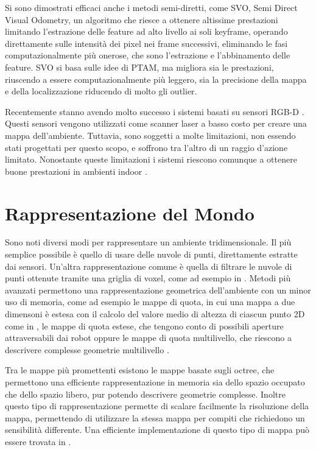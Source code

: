 Si sono dimostrati efficaci anche i metodi semi-diretti, come SVO, Semi Direct Visual Odometry, un algoritmo che riesce a ottenere altissime prestazioni limitando l'estrazione delle feature ad alto livello ai soli keyframe, operando direttamente sulle intensità dei pixel nei frame successivi, eliminando le fasi computazionalmente più onerose, che sono l'estrazione e l'abbinamento delle feature. SVO si basa sulle idee di PTAM, ma migliora sia le prestazioni, riuscendo a essere computazionalmente più leggero, sia la precisione della mappa e della localizzazione riducendo di molto gli outlier.

Recentemente stanno avendo molto successo i sistemi basati su sensori RGB-D \cite{izadi2011kinectfusion} \cite{henry2012rgb}. Questi sensori vengono utilizzati come scanner laser a basso costo per creare una mappa dell'ambiente. Tuttavia, sono soggetti a molte limitazioni, non essendo stati progettati per questo scopo, e soffrono tra l'altro di un raggio d'azione limitato. Nonostante queste limitazioni i sistemi riescono comunque a ottenere buone prestazioni in ambienti indoor \cite{sturm2012benchmark}.

\section{Rappresentazione del Mondo}

Sono noti diversi modi per rappresentare un ambiente tridimensionale.
Il più semplice possibile è quello di usare delle nuvole di punti, direttamente estratte dai sensori. Un'altra rappresentazione comune è quella di filtrare le nuvole di punti ottenute tramite una griglia di voxel, come ad esempio in \cite{30724}.
Metodi più avanzati permettono una rappresentazione geometrica dell'ambiente con un minor uso di memoria, come ad esempio le mappe di quota, in cui una mappa a due dimensoni è estesa con il calcolo del valore medio di altezza di ciascun punto 2D come in \cite{herbert1989terrain}, le mappe di quota estese, che tengono conto di possibili aperture attraversabili dai robot oppure le mappe di quota multilivello, che riescono a descrivere complesse geometrie multilivello \cite{4058725}.

Tra le mappe più promettenti esistono le mappe basate sugli octree, che permettono una efficiente rappresentazione in memoria sia dello spazio occupato che dello spazio libero, pur potendo descrivere geometrie complesse. Inoltre questo tipo di rappresentazione permette di scalare facilmente la risoluzione della mappa, permettendo di utilizzare la stessa mappa per compiti che richiedono un sensibilità differente. Una efficiente implementazione di questo tipo di mappa può essere trovata in \cite{hornung13auro}.

